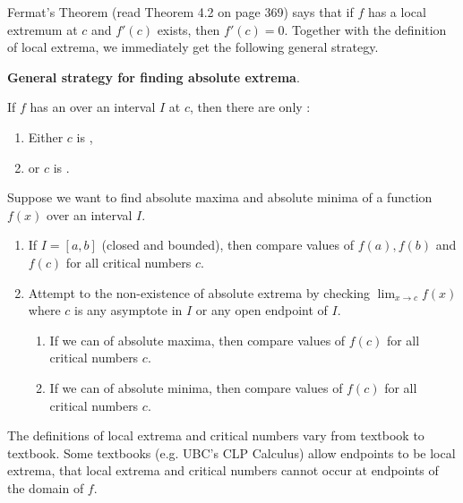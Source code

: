 \documentclass[../main.tex]{subfiles}
\begin{document}
Fermat's Theorem (read Theorem 4.2 on page 369) says that if \(f\) has a local extremum at \(c\) and \(f'(c)\) exists, then \(f'(c) = 0\). Together with the definition of local extrema, we immediately get the following general strategy.

\begin{mdframed}[style=simple-compact]
  \textbf{General strategy for finding absolute extrema}. 

  If \(f\) has an  over an interval \(I\) at \(c\), then there are only :
  \begin{enumerate}
    \item Either \(c\) is \underline{\hspace{4in}},
    \item or \(c\) is \underline{\hspace{4in}}.
  \end{enumerate}
\end{mdframed}

Suppose we want to find absolute maxima and absolute minima of a function \(f(x)\) over an interval \(I\).
\begin{enumerate}
  \item If \(I = [a,b]\) (closed and bounded), then compare values of \(f(a), f(b)\) and \(f(c)\) for all critical numbers \(c\).

  \item Attempt to  the non-existence of absolute extrema by checking \(\lim_{x \to c}f(x)\) where \(c\) is any asymptote in \(I\) or any open endpoint of \(I\).
    \begin{enumerate}
      \item If we can  of absolute maxima, then compare values of \(f(c)\) for all critical numbers \(c\).
      \item If we can  of absolute minima, then compare values of \(f(c)\) for all critical numbers \(c\).
    \end{enumerate}
\end{enumerate}
\bigskip{}

\faExclamationTriangle{} The definitions of local extrema and critical numbers vary from textbook to textbook. Some textbooks (e.g. UBC's CLP Calculus) allow endpoints to be local extrema,  that local extrema and critical numbers cannot occur at endpoints of the domain of \(f\).
\end{document}
